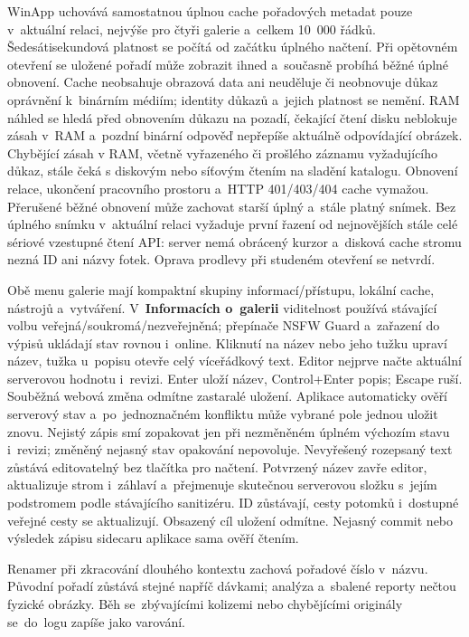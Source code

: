 \documentclass[11pt,a4paper]{article}
\newcommand{\ui}[1]{\textbf{#1}}
\begin{document}
WinApp uchovává samostatnou úplnou cache pořadových metadat pouze v~aktuální
relaci, nejvýše pro čtyři galerie a~celkem 10~000 řádků. Šedesátisekundová
platnost se počítá od začátku úplného načtení. Při opětovném otevření se uložené
pořadí může zobrazit ihned a~současně probíhá běžné úplné obnovení. Cache
neobsahuje obrazová data ani neuděluje či neobnovuje důkaz oprávnění k~binárním
médiím; identity důkazů a~jejich platnost se nemění. RAM náhled se hledá před
obnovením důkazu na pozadí, čekající čtení disku neblokuje zásah v~RAM a~pozdní
binární odpověď nepřepíše aktuálně odpovídající obrázek. Chybějící zásah v RAM, včetně vyřazeného či prošlého záznamu vyžadujícího důkaz, stále čeká s diskovým nebo síťovým čtením na sladění katalogu. Obnovení relace,
ukončení pracovního prostoru a~HTTP 401/403/404 cache vymažou. Přerušené běžné
obnovení může zachovat starší úplný a~stále platný snímek. Bez úplného snímku
v~aktuální relaci vyžaduje první řazení od nejnovějších stále celé sériové
vzestupné čtení API: server nemá obrácený kurzor a~disková cache stromu nezná ID
ani názvy fotek. Oprava prodlevy při studeném otevření se netvrdí.

Obě menu galerie mají kompaktní skupiny informací/přístupu, lokální cache,
nástrojů a~vytváření. V~\ui{Informacích o~galerii} viditelnost používá stávající
volbu veřejná/soukromá/nezveřejněná; přepínače NSFW Guard a~zařazení do výpisů
ukládají stav rovnou i~online. Kliknutí na název nebo jeho tužku upraví název,
tužka u~popisu otevře celý víceřádkový text. Editor nejprve načte aktuální
serverovou hodnotu i~revizi. Enter uloží název, Control+Enter popis; Escape ruší.
Souběžná webová změna odmítne zastaralé uložení. Aplikace automaticky ověří
serverový stav a~po~jednoznačném konfliktu může vybrané pole jednou uložit znovu.
Nejistý zápis smí zopakovat jen při nezměněném úplném výchozím stavu i~revizi;
změněný nejasný stav opakování nepovoluje. Nevyřešený rozepsaný text zůstává
editovatelný bez tlačítka pro načtení. Potvrzený název zavře editor,
aktualizuje strom i~záhlaví a~přejmenuje skutečnou serverovou
složku s~jejím podstromem podle stávajícího sanitizéru. ID zůstávají, cesty
potomků i~dostupné veřejné cesty se aktualizují. Obsazený cíl uložení odmítne.
Nejasný commit nebo výsledek zápisu sidecaru aplikace sama ověří čtením.

Renamer při zkracování dlouhého kontextu zachová pořadové číslo v~názvu.
Původní pořadí zůstává stejné napříč dávkami; analýza a~sbalené reporty
nečtou fyzické obrázky. Běh se~zbývajícími kolizemi nebo chybějícími originály
se~do~logu zapíše jako varování.
\end{document}
